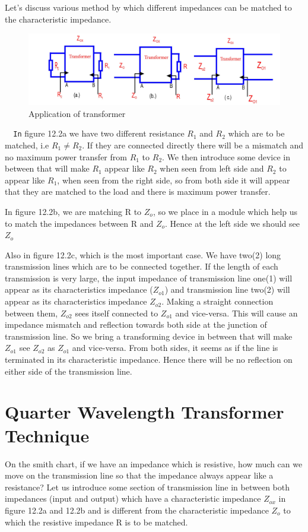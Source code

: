 Let's discuss various method by which different impedances can be matched to the characteristic impedance.
\begin{figure}[h]
\centering
\includegraphics[width=1\linewidth]{./graphics/fig8}
\caption{Application of transformer}
\end{figure}
\verb| 	In| figure 12.2a we have two different resistance $R_1$ and $R_2$ which are to be matched, i.e $R_1\neq R_2$. If they are connected directly there will be a mismatch and no maximum power transfer from $R_1$ to $R_2$. We then introduce some  device in between that will make $R_1$ appear like $R_2$ when seen  from left side and $R_2$ to appear like  $R_1$, when seen from the right side, so from both side it will appear that they are matched to the load and there is maximum power transfer.

In figure 12.2b, we are matching R to $Z_o$, so we place in a module which help us to match the impedances between R and $Z_o$. Hence at the left side we should see $ Z_o$

Also in figure 12.2c, which is the most important case. We have two(2) long transmission lines which are to be connected together. If the length of each transmission is very large, the input impedance of transmission line one(1) will appear as its characteristics impedance ($ Z_{o1}$) and transmission line two(2) will appear as its characteristics impedance $ Z_{o2}$. Making a straight connection between them,  $ Z_{o2}$ sees itself connected to $ Z_{o1}$ and vice-versa. This will cause an impedance mismatch and reflection towards both side at the junction of transmission line. So we bring a transforming device in between that will make  $Z_{o1}$ see $Z_{o2}$ as $Z_{o1}$ and vice-versa. From both sides, it seems as if the line is terminated in its characteristic impedance. Hence there will be no reflection on either side of the transmission line.

\section{Quarter Wavelength Transformer Technique}
On the smith chart, if we have an impedance which is resistive, how much can we move on the transmission line so that the impedance always appear like a resistance? Let us introduce some section of transmission line in between both impedances (input and output) which have a characteristic impedance $ Z_{ox}$ in figure 12.2a and 12.2b  and is different from the characteristic impedance  $ Z_o$ to which the resistive impedance R is to be matched.

